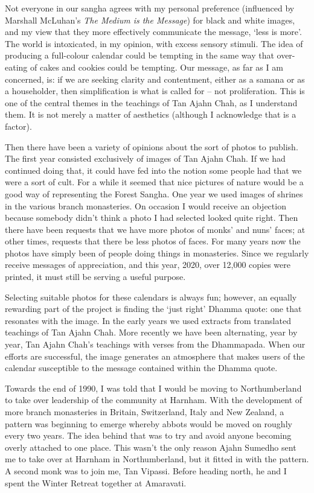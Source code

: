 Not everyone in our sangha agrees with my personal preference
(influenced by Marshall McLuhan's \emph{The Medium is the Message}) for
black and white images, and my view that they more effectively
communicate the message, `less is more'. The world is intoxicated, in my
opinion, with excess sensory stimuli. The idea of producing a
full-colour calendar could be tempting in the same way that over-eating
of cakes and cookies could be tempting. Our message, as far as I am
concerned, is: if we are seeking clarity and contentment, either as a
samana or as a householder, then simplification is what is called for --
not proliferation. This is one of the central themes in the teachings of Tan Ajahn Chah,
as I understand them. It is not merely a matter of aesthetics (although
I acknowledge that is a factor).

Then there have been a variety of opinions about the sort of photos to
publish. The first year consisted exclusively of images of Tan Ajahn
Chah. If we had continued doing that, it could have fed into the notion
some people had that we were a sort of cult. For a while it seemed that
nice pictures of nature would be a good way of representing the Forest
Sangha. One year we used images of shrines in the various branch
monasteries. On occasion I would receive an objection because somebody
didn't think a photo I had selected looked quite right. Then there have
been requests that we have more photos of monks' and nuns' faces; at
other times, requests that there be less photos of faces. For many years
now the photos have simply been of people doing things in monasteries.
Since we regularly receive messages of appreciation, and
this year, 2020, over 12,000 copies were printed,
it must still be serving a useful purpose.

Selecting suitable photos for these calendars is always fun; however, an
equally rewarding part of the project is finding the `just right' Dhamma
quote: one that resonates with the image. In the early years we used
extracts from translated teachings of Tan Ajahn Chah. More recently we
have been alternating, year by year, Tan Ajahn Chah's teachings with
verses from the Dhammapada. When our efforts are successful, the image
generates an atmosphere that makes users of the calendar susceptible to
the message contained within the Dhamma quote.

Towards the end of 1990, I was told that I would be moving to
Northumberland to take over leadership of the community at Harnham. With
the development of more branch monasteries in Britain, Switzerland,
Italy and New Zealand, a pattern was beginning to emerge whereby abbots
would be moved on roughly every two years. The idea behind that was to
try and avoid anyone becoming overly attached to one place. This wasn't
the only reason Ajahn Sumedho sent me to take over at Harnham in
Northumberland, but it fitted in with the pattern. A second monk was to
join me, Tan Vipassi. Before heading north, he and I spent the Winter
Retreat together at Amaravati.

